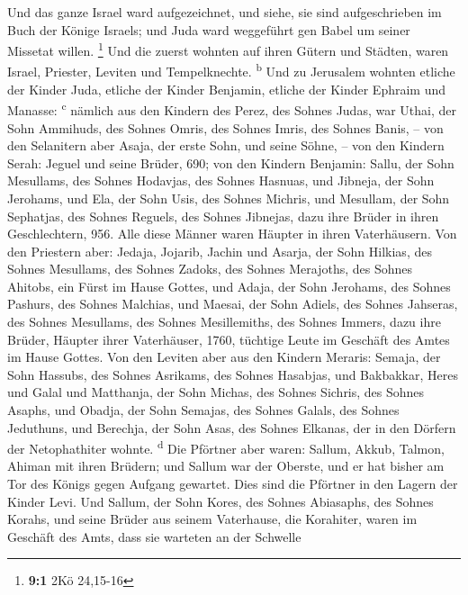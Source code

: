  Und das ganze Israel ward aufgezeichnet, und siehe, sie
sind aufgeschrieben im Buch der Könige Israels; und Juda ward weggeführt
gen Babel um seiner Missetat willen. \footnote{\textbf{9:1} 2Kö 24,15-16}
 Und die zuerst wohnten auf ihren Gütern und Städten,
waren Israel, Priester, Leviten und Tempelknechte. \textsuperscript{b}
 Und zu Jerusalem wohnten etliche der Kinder Juda, etliche
der Kinder Benjamin, etliche der Kinder Ephraim und Manasse:
\textsuperscript{c}  nämlich aus den Kindern des Perez,
des Sohnes Judas, war Uthai, der Sohn Ammihuds, des Sohnes Omris, des
Sohnes Imris, des Sohnes Banis, --  von den Selanitern
aber Asaja, der erste Sohn, und seine Söhne, --  von den
Kindern Serah: Jeguel und seine Brüder, 690;  von den
Kindern Benjamin: Sallu, der Sohn Mesullams, des Sohnes Hodavjas, des
Sohnes Hasnuas,  und Jibneja, der Sohn Jerohams, und Ela,
der Sohn Usis, des Sohnes Michris, und Mesullam, der Sohn Sephatjas, des
Sohnes Reguels, des Sohnes Jibnejas,  dazu ihre Brüder in
ihren Geschlechtern, 956. Alle diese Männer waren Häupter in ihren
Vaterhäusern.  Von den Priestern aber: Jedaja, Jojarib,
Jachin  und Asarja, der Sohn Hilkias, des Sohnes
Mesullams, des Sohnes Zadoks, des Sohnes Merajoths, des Sohnes Ahitobs,
ein Fürst im Hause Gottes,  und Adaja, der Sohn Jerohams,
des Sohnes Pashurs, des Sohnes Malchias, und Maesai, der Sohn Adiels,
des Sohnes Jahseras, des Sohnes Mesullams, des Sohnes Mesillemiths, des
Sohnes Immers,  dazu ihre Brüder, Häupter ihrer
Vaterhäuser, 1760, tüchtige Leute im Geschäft des Amtes im Hause Gottes.
 Von den Leviten aber aus den Kindern Meraris: Semaja,
der Sohn Hassubs, des Sohnes Asrikams, des Sohnes Hasabjas,
 und Bakbakkar, Heres und Galal und Matthanja, der Sohn
Michas, des Sohnes Sichris, des Sohnes Asaphs,  und
Obadja, der Sohn Semajas, des Sohnes Galals, des Sohnes Jeduthuns, und
Berechja, der Sohn Asas, des Sohnes Elkanas, der in den Dörfern der
Netophathiter wohnte. \textsuperscript{d}  Die Pförtner
aber waren: Sallum, Akkub, Talmon, Ahiman mit ihren Brüdern; und Sallum
war der Oberste,  und er hat bisher am Tor des Königs
gegen Aufgang gewartet. Dies sind die Pförtner in den Lagern der Kinder
Levi.  Und Sallum, der Sohn Kores, des Sohnes Abiasaphs,
des Sohnes Korahs, und seine Brüder aus seinem Vaterhause, die
Korahiter, waren im Geschäft des Amts, dass sie warteten an der Schwelle
